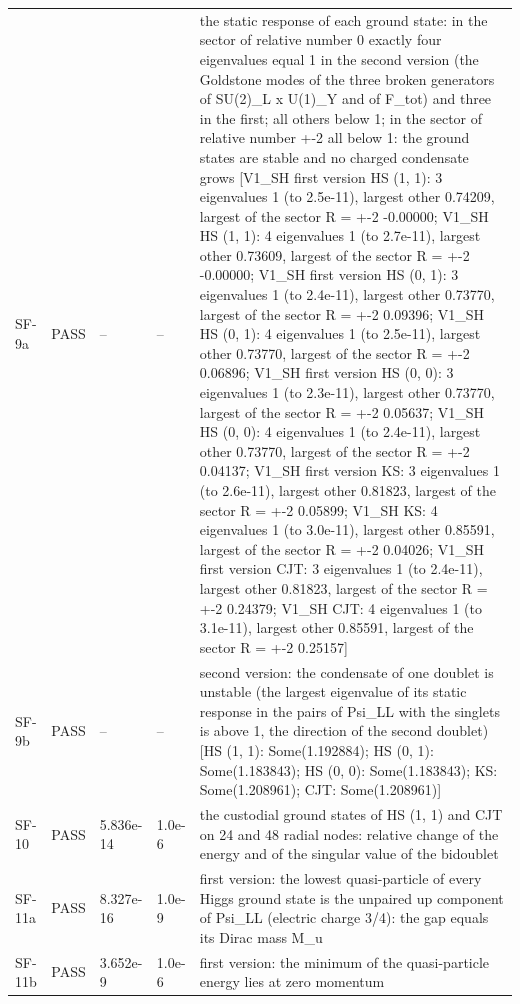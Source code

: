 \documentclass[aps,prd,onecolumn,superscriptaddress,nofootinbib,floatfix,longbibliography]{revtex4-2}
\begin{document}
\begin{longtable}{p{}p{}p{}p{}p{}}
SF-9a & PASS & -- & -- & the static response of each ground state: in the sector of relative number 0 exactly four eigenvalues equal 1 in the second version (the Goldstone modes of the three broken generators of SU(2)\_L x U(1)\_Y and of F\_tot) and three in the first; all others below 1; in the sector of relative number +-2 all below 1: the ground states are stable and no charged condensate grows [V1\_SH first version HS (1, 1): 3 eigenvalues 1 (to 2.5e-11), largest other 0.74209, largest of the sector R = +-2 -0.00000; V1\_SH HS (1, 1): 4 eigenvalues 1 (to 2.7e-11), largest other 0.73609, largest of the sector R = +-2 -0.00000; V1\_SH first version HS (0, 1): 3 eigenvalues 1 (to 2.4e-11), largest other 0.73770, largest of the sector R = +-2 0.09396; V1\_SH HS (0, 1): 4 eigenvalues 1 (to 2.5e-11), largest other 0.73770, largest of the sector R = +-2 0.06896; V1\_SH first version HS (0, 0): 3 eigenvalues 1 (to 2.3e-11), largest other 0.73770, largest of the sector R = +-2 0.05637; V1\_SH HS (0, 0): 4 eigenvalues 1 (to 2.4e-11), largest other 0.73770, largest of the sector R = +-2 0.04137; V1\_SH first version KS: 3 eigenvalues 1 (to 2.6e-11), largest other 0.81823, largest of the sector R = +-2 0.05899; V1\_SH KS: 4 eigenvalues 1 (to 3.0e-11), largest other 0.85591, largest of the sector R = +-2 0.04026; V1\_SH first version CJT: 3 eigenvalues 1 (to 2.4e-11), largest other 0.81823, largest of the sector R = +-2 0.24379; V1\_SH CJT: 4 eigenvalues 1 (to 3.1e-11), largest other 0.85591, largest of the sector R = +-2 0.25157] \\
SF-9b & PASS & -- & -- & second version: the condensate of one doublet is unstable (the largest eigenvalue of its static response in the pairs of Psi\_LL with the singlets is above 1, the direction of the second doublet) [HS (1, 1): Some(1.192884); HS (0, 1): Some(1.183843); HS (0, 0): Some(1.183843); KS: Some(1.208961); CJT: Some(1.208961)] \\
SF-10 & PASS & 5.836e-14 & 1.0e-6 & the custodial ground states of HS (1, 1) and CJT on 24 and 48 radial nodes: relative change of the energy and of the singular value of the bidoublet \\
SF-11a & PASS & 8.327e-16 & 1.0e-9 & first version: the lowest quasi-particle of every Higgs ground state is the unpaired up component of Psi\_LL (electric charge 3/4): the gap equals its Dirac mass \textbar{}M\_u\textbar{} \\
SF-11b & PASS & 3.652e-9 & 1.0e-6 & first version: the minimum of the quasi-particle energy lies at zero momentum \\

\end{longtable}
\end{document}
